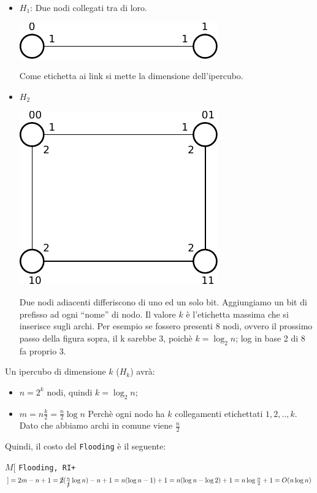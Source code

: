 \begin{itemize}
  \item $H_1$: Due nodi collegati tra di loro.
  \begin{center}
    \includegraphics[scale=0.8]{images/n_10}
  \end{center}
  Come etichetta ai link si mette la dimensione dell'ipercubo.
  
  \item $H_2$
  \begin{center}
    \includegraphics[scale=0.8]{images/n_11}
  \end{center}
  Due nodi adiacenti differiscono di uno ed un solo bit. Aggiungiamo un bit di prefisso ad ogni ``nome'' di nodo.
  Il valore $k$ è l'etichetta massima che si inserisce sugli archi. Per esempio se fossero presenti 8 nodi, ovvero il prossimo passo della figura sopra, il k sarebbe 3, poichè $k = \log_2{n}$; log in base 2 di 8 fa proprio 3.
\end{itemize}

Un ipercubo di dimensione $k$ ($H_k$) avrà:
\begin{itemize}
  \item $n = 2^k$ nodi, quindi $k = \log_2{n}$;
  \item $m = n \frac{k}{2} = \frac{n}{2} \log n$ Perchè ogni nodo ha $k$ collegamenti etichettati $1,2,..,k$. Dato che abbiamo archi in comune viene $\frac{n}{2}$
\end{itemize}

Quindi, il costo del \texttt{Flooding} è il seguente:

$M[$ \texttt{Flooding, RI+} $] = 2m-n+1 = \cancel{2}(\frac{n}{\cancel{2}} \log n)-n+1 = n(\log n -1) +1 = n(\log n -\log 2) +1 = n\log{\frac{n}{2}}+1 = O(n \log n)$

